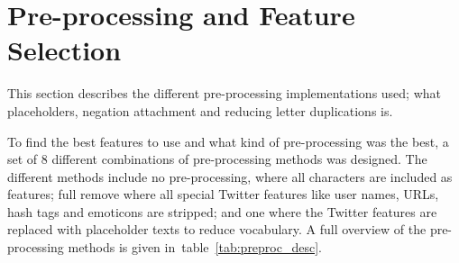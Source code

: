 \section{Pre-processing and Feature Selection}

This section describes the different pre-processing implementations used; what placeholders, negation attachment and reducing letter duplications is.

To find the best features to use and what kind of pre-processing was the best, a set of 8 different combinations of pre-processing methods was designed. The different methods include no pre-processing, where all characters are included as features; full remove where all special Twitter features like user names, URLs, hash tags and emoticons are stripped; and one where the Twitter features are replaced with placeholder texts to reduce vocabulary. A full overview of the pre-processing methods is given in~table~\ref{tab:preproc_desc}.

